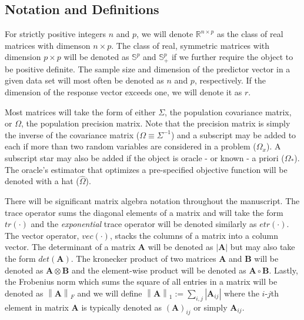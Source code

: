 \documentclass[11pt,]{report}
\theoremstyle{definition}
\theoremstyle{definition}
\theoremstyle{definition}
\theoremstyle{remark}
\begin{document}
\hypertarget{notation-and-definitions}{%
\subsection{Notation and Definitions}\label{notation-and-definitions}}

For strictly positive integers \(n\) and \(p\), we will denote \(\mathbb{R}^{n \times p}\) as the class of real matrices with dimenson \(n \times p\). The class of real, symmetric matrices with dimension \(p \times p\) will be denoted as \(\mathbb{S}^{p}\) and \(\mathbb{S}^{p}_{+}\) if we further require the object to be positive definite. The sample size and dimension of the predictor vector in a given data set will most often be denoted as \(n\) and \(p\), respectively. If the dimension of the response vector exceeds one, we will denote it as \(r\).

Most matrices will take the form of either \(\Sigma\), the population covariance matrix, or \(\Omega\), the population precision matrix. Note that the precision matrix is simply the inverse of the covariance matrix (\(\Omega \equiv \Sigma^{-1}\)) and a subscript may be added to each if more than two random variables are considered in a problem (\(\Omega_{x}\)). A subscript star may also be added if the object is oracle - or known - a priori (\(\Omega_{*}\)). The oracle's estimator that optimizes a pre-specified objective function will be denoted with a hat (\(\hat{\Omega}\)).

There will be significant matrix algebra notation throughout the manuscript. The trace operator sums the diagonal elements of a matrix and will take the form \(tr\left(\cdot\right)\) and the \emph{exponential} trace operator will be denoted similarly as \(etr\left(\cdot\right)\). The vector operator, \(vec\left(\cdot\right)\), stacks the columns of a matrix into a column vector. The determinant of a matrix \(\mathbf{A}\) will be denoted as \(\left|\mathbf{A}\right|\) but may also take the form \(det\left(\mathbf{A}\right)\). The kronecker product of two matrices \(\mathbf{A}\) and \(\mathbf{B}\) will be denoted as \(\mathbf{A} \otimes \mathbf{B}\) and the element-wise product will be denoted as \(\mathbf{A} \circ \mathbf{B}\). Lastly, the Frobenius norm which sums the square of all entries in a matrix will be denoted as \(\left\|\mathbf{A}\right\|_{F}\) and we will define \(\left\|\mathbf{A}\right\|_{1} := \sum_{i, j}\left|\mathbf{A}_{ij}\right|\) where the \(i\)-\(j\)th element in matrix \(\mathbf{A}\) is typically denoted as \(\left(\mathbf{A}\right)_{ij}\) or simply \(\mathbf{A}_{ij}\).
\end{document}
